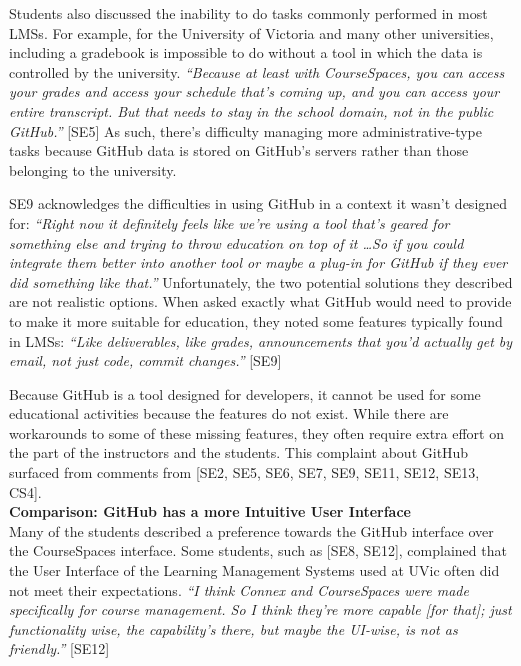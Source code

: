 Students also discussed the inability to do tasks commonly performed in most LMSs. For example, for the University of Victoria and many other universities, including a gradebook is impossible to do without a tool in which the data is controlled by the university. \textit{``Because at least with CourseSpaces, you can access your grades and access your schedule that's coming up, and you can access your entire transcript. But that needs to stay in the school domain, not in the public GitHub.''} [SE5] As such, there's difficulty managing more administrative-type tasks because GitHub data is stored on GitHub's servers rather than those belonging to the university.


SE9 acknowledges the difficulties in using GitHub in a context it wasn't designed for: \textit{``Right now it definitely feels like we're using a tool that's geared for something else and trying to throw education on top of it \ldots So if you could integrate them better into another tool or maybe a plug-in for GitHub if they ever did something like that.''} Unfortunately, the two potential solutions they described are not realistic options. When asked exactly what GitHub would need to provide to make it more suitable for education, they noted some features typically found in LMSs: \textit{``Like deliverables, like grades, announcements that you'd actually get by email, not just code, commit changes.''} [SE9]

Because GitHub is a tool designed for developers, it cannot be used for some educational activities because the features do not exist. While there are workarounds to some of these missing features, they often require extra effort on the part of the instructors and the students. This complaint about GitHub surfaced from comments from [SE2, SE5, SE6, SE7, SE9, SE11, SE12, SE13, CS4]. \\

\textbf{Comparison: GitHub has a more Intuitive User Interface} \\
Many of the students described a preference towards the GitHub interface over the CourseSpaces interface. Some students, such as [SE8, SE12], complained that the User Interface of the Learning Management Systems used at UVic often did not meet their expectations. \textit{``I think Connex and CourseSpaces were made specifically for course management. So I think they're more capable [for that]; just functionality wise, the capability's there, but maybe the UI-wise, is not as friendly.''} [SE12]

